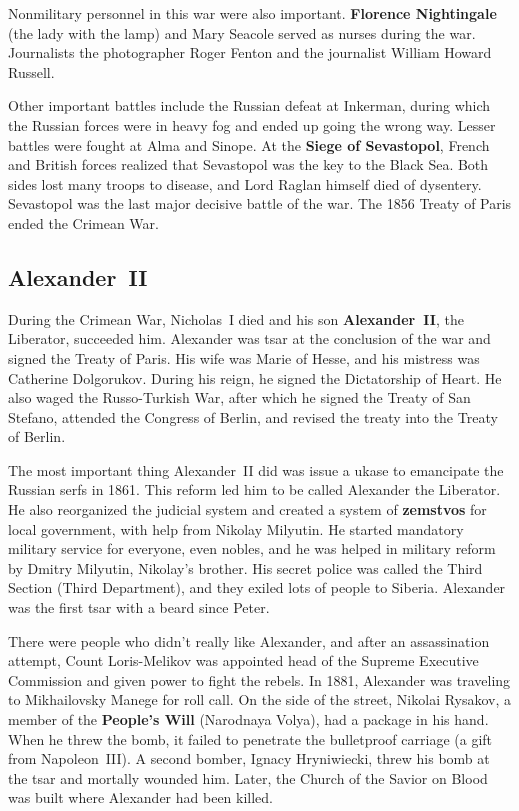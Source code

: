 Nonmilitary personnel in this war were also important.
\textbf{Florence Nightingale} (the lady with the lamp)
and Mary Seacole served as nurses during the war.
Journalists the photographer Roger Fenton and the journalist William Howard Russell.

Other important battles include the Russian defeat at Inkerman,
during which the Russian forces were in heavy fog and ended up going the wrong way.
Lesser battles were fought at Alma and Sinope.
At the \textbf{Siege of Sevastopol},
French and British forces realized that Sevastopol was the key to the Black Sea.
Both sides lost many troops to disease, and Lord Raglan himself died of dysentery.
Sevastopol was the last major decisive battle of the war.
The 1856 Treaty of Paris ended the Crimean War.

\subsection*{Alexander~II}

During the Crimean War,
Nicholas~I died and his son \textbf{Alexander~II}, the Liberator, succeeded him.
Alexander was tsar at the conclusion of the war and signed the Treaty of Paris.
His wife was Marie of Hesse, and his mistress was Catherine Dolgorukov.
During his reign, he signed the Dictatorship of Heart.
He also waged the Russo-Turkish War, after which he signed the Treaty of San Stefano,
attended the Congress of Berlin, and revised the treaty into the Treaty of Berlin.

The most important thing Alexander~II did was issue a ukase to emancipate the Russian serfs in 1861.
This reform led him to be called Alexander the Liberator.
He also reorganized the judicial system
and created a system of \textbf{zemstvos} for local government,
with help from Nikolay Milyutin.
He started mandatory military service for everyone, even nobles,
and he was helped in military reform by Dmitry Milyutin, Nikolay's brother.
His secret police was called the Third Section (Third Department),
and they exiled lots of people to Siberia.
Alexander was the first tsar with a beard since Peter.

There were people who didn't really like Alexander, and after an assassination attempt,
Count Loris-Melikov was appointed head of the Supreme Executive Commission
and given power to fight the rebels.
In 1881, Alexander was traveling to Mikhailovsky Manege for roll call.
On the side of the street, Nikolai Rysakov,
a member of the \textbf{People's Will} (Narodnaya Volya),
had a package in his hand.
When he threw the bomb, it failed to penetrate the bulletproof carriage (a gift from Napoleon~III).
A second bomber, Ignacy Hryniwiecki, threw his bomb at the tsar and mortally wounded him.
Later, the Church of the Savior on Blood was built where Alexander had been killed.


